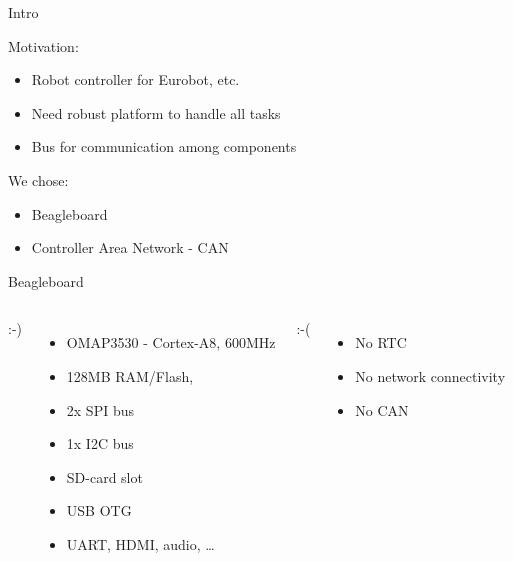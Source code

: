 \documentclass{beamer}
\begin{document}
\begin{frame}{Intro}

Motivation:
\begin{itemize}
\item Robot controller for Eurobot, etc.
\item Need robust platform to handle all tasks
\item Bus for communication among components
\end{itemize}

We chose:
\begin{itemize}
\item Beagleboard
\item Controller Area Network - CAN
\end{itemize}
\end{frame}

\begin{frame}{Beagleboard}
\begin{columns}[c]

:-)
\begin{itemize}
\item OMAP3530 - Cortex-A8, 600MHz
\item 128MB RAM/Flash,
\item 2x SPI bus 
\item 1x I2C bus 
\item SD-card slot
\item USB OTG
\item UART, HDMI, audio, \ldots
\end{itemize}

:-(
\begin{itemize}
\item No RTC
\item No network connectivity
\item No CAN
\end{itemize}


\end{columns}
\end{frame}
\end{document}
